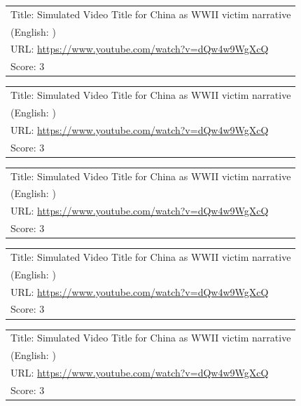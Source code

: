 \documentclass{article}
\begin{document}
\noindent
\begin{tabular}{p{}}
Title: Simulated Video Title for China as WWII victim narrative \\
(English: ) \\
URL: \url{https://www.youtube.com/watch?v=dQw4w9WgXcQ} \\
Score: 3 \\
\end{tabular}
\vspace{0.5em}

\noindent
\begin{tabular}{p{}}
Title: Simulated Video Title for China as WWII victim narrative \\
(English: ) \\
URL: \url{https://www.youtube.com/watch?v=dQw4w9WgXcQ} \\
Score: 3 \\
\end{tabular}
\vspace{0.5em}

\noindent
\begin{tabular}{p{}}
Title: Simulated Video Title for China as WWII victim narrative \\
(English: ) \\
URL: \url{https://www.youtube.com/watch?v=dQw4w9WgXcQ} \\
Score: 3 \\
\end{tabular}
\vspace{0.5em}

\noindent
\begin{tabular}{p{}}
Title: Simulated Video Title for China as WWII victim narrative \\
(English: ) \\
URL: \url{https://www.youtube.com/watch?v=dQw4w9WgXcQ} \\
Score: 3 \\
\end{tabular}
\vspace{0.5em}

\noindent
\begin{tabular}{p{}}
Title: Simulated Video Title for China as WWII victim narrative \\
(English: ) \\
URL: \url{https://www.youtube.com/watch?v=dQw4w9WgXcQ} \\
Score: 3 \\
\end{tabular}
\vspace{0.5em}
\end{document}
